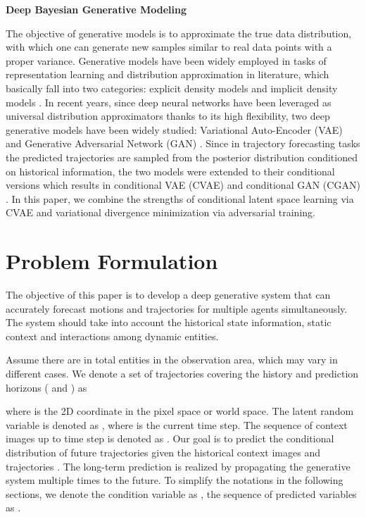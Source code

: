 \documentclass[letterpaper, 10 pt, conference]{ieeeconf}
\begin{document}
\noindent
\textbf{Deep Bayesian Generative Modeling}

The objective of generative models is to approximate the true data distribution, with which one can generate new samples similar to real data points with a proper variance.
Generative models have been widely employed in tasks of representation learning and distribution approximation in literature, which basically fall into two categories: explicit density models and implicit density models \cite{gan-tutorial}. 
In recent years, since deep neural networks have been leveraged as universal distribution approximators thanks to its high flexibility, two deep generative models have been widely studied: Variational Auto-Encoder (VAE) \cite{VAE} and Generative Adversarial Network (GAN) \cite{gan}. 
Since in trajectory forecasting tasks the predicted trajectories are sampled from the posterior distribution conditioned on historical information, the two models were extended to their conditional versions which results in conditional VAE (CVAE) \cite{A13} and conditional GAN (CGAN) \cite{cgan,A1}.
In this paper, we combine the strengths of conditional latent space learning via CVAE and variational divergence minimization via adversarial training.

\section{Problem Formulation}
The objective of this paper is to develop a deep generative system that can accurately forecast motions and trajectories for multiple agents simultaneously. The system should take into account the historical state information, static context and interactions among dynamic entities.

Assume there are in total  entities in the observation area, which may vary in different cases. 
We denote a set of trajectories covering the history and prediction horizons ( and ) as

where  is the 2D coordinate in the pixel space or world space.
The latent random variable is denoted as , where  is the current time step.
The sequence of context images up to time step  is denoted as .
Our goal is to predict the conditional distribution of future trajectories given the historical context images and trajectories .
The long-term prediction is realized by propagating the generative system multiple times to the future.
To simplify the notations in the following sections, we denote the condition variable as , the sequence of predicted variables as .
\end{document}
